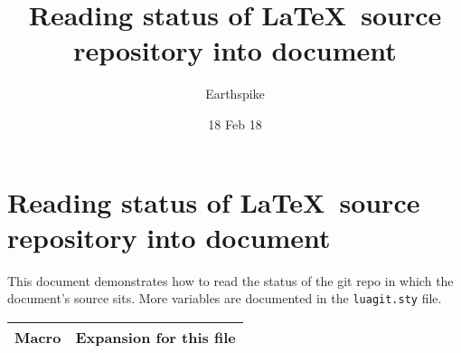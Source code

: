 \documentclass[a4paper]{article}
\title{Reading status of \LaTeX\ source repository into document}
\author{Earthspike}
\date{18 Feb 18}
\begin{document}
\begin{titlepage}
\maketitle
\end{titlepage}


\section{Reading status of \LaTeX\ source repository into document}

This document demonstrates how to read the status of the git repo in
which the document's source sits. More variables are documented in the
\verb|luagit.sty| file.

\begin{longtable}{p{} p{}}
  Macro & Expansion for this file \\\hline
  

\end{longtable}
\end{document}

